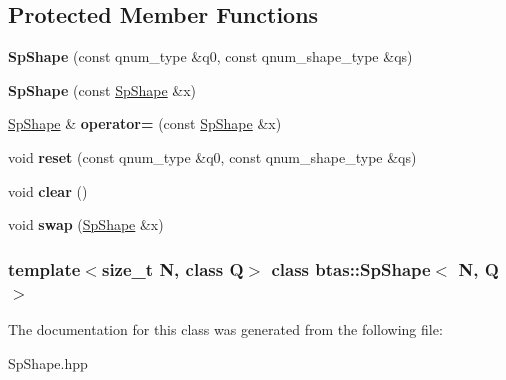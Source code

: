 \subsection*{Protected Member Functions}
\begin{DoxyCompactItemize}
\item 
\hypertarget{classbtas_1_1_sp_shape_a1f9b8ad8d560b0fe275b00fb60df9a47}{
{\bfseries SpShape} (const qnum\_\-type \&q0, const qnum\_\-shape\_\-type \&qs)}
\label{classbtas_1_1_sp_shape_a1f9b8ad8d560b0fe275b00fb60df9a47}

\item 
\hypertarget{classbtas_1_1_sp_shape_a6ee3866eddc666be10cd7e0d602c78bd}{
{\bfseries SpShape} (const \hyperlink{classbtas_1_1_sp_shape}{SpShape} \&x)}
\label{classbtas_1_1_sp_shape_a6ee3866eddc666be10cd7e0d602c78bd}

\item 
\hypertarget{classbtas_1_1_sp_shape_a243441456fda07482a10967b658b8307}{
\hyperlink{classbtas_1_1_sp_shape}{SpShape} \& {\bfseries operator=} (const \hyperlink{classbtas_1_1_sp_shape}{SpShape} \&x)}
\label{classbtas_1_1_sp_shape_a243441456fda07482a10967b658b8307}

\item 
\hypertarget{classbtas_1_1_sp_shape_aee782b333e2af19cc58187dbd173b245}{
void {\bfseries reset} (const qnum\_\-type \&q0, const qnum\_\-shape\_\-type \&qs)}
\label{classbtas_1_1_sp_shape_aee782b333e2af19cc58187dbd173b245}

\item 
\hypertarget{classbtas_1_1_sp_shape_aa26005ed2c77f8ad467a70bd00c868a0}{
void {\bfseries clear} ()}
\label{classbtas_1_1_sp_shape_aa26005ed2c77f8ad467a70bd00c868a0}

\item 
\hypertarget{classbtas_1_1_sp_shape_a8f853c461ad360ae968e97897907b4a9}{
void {\bfseries swap} (\hyperlink{classbtas_1_1_sp_shape}{SpShape} \&x)}
\label{classbtas_1_1_sp_shape_a8f853c461ad360ae968e97897907b4a9}

\end{DoxyCompactItemize}
\subsubsection*{template$<$size\_\-t N, class Q$>$ class btas::SpShape$<$ N, Q $>$}



The documentation for this class was generated from the following file:\begin{DoxyCompactItemize}
\item 
SpShape.hpp\end{DoxyCompactItemize}
